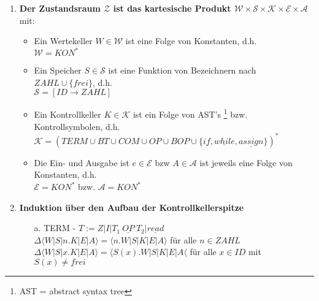 \begin{enumerate}
	\item \textbf{Der Zustandsraum $\mathcal{Z}$ ist das kartesische Produkt $\mathcal{W}\times\mathcal{S}\times\mathcal{K}\times\mathcal{E}\times\mathcal{A}$} mit:\\
		\begin{itemize}
			\item Ein Wertekeller $W\in\mathcal{W}$ ist eine Folge von Konstanten, d.h.\\ $\mathcal{W}=KON^*$
			\item Ein Speicher $S\in\mathcal{S}$ ist eine Funktion von Bezeichnern nach $ZAHL \cup \lbrace frei\rbrace$, d.h.\\ $\mathcal{S}=[ID\rightarrow ZAHL]$
			\item Ein Kontrollkeller $K\in\mathcal{K}$ ist ein Folge von AST's \footnote{AST = abstract syntax tree} bzw. Kontrollsymbolen, d.h.\\ $\mathcal{K}=\left(TERM \cup BT \cup COM \cup OP \cup BOP \cup \{\underline{if},\underline{while},\underline{assign}\}\right)^*$
			\item Die Ein- und Ausgabe ist $e\in\mathcal{E}$ bzw $A\in\mathcal{A}$ ist jeweils eine Folge von Konstanten, d.h.\\ $\mathcal{E} = KON^*$ bzw. $\mathcal{A} = KON^*$
		\end{itemize}
	\item \textbf{Induktion über den Aufbau der Kontrollkellerspitze}
		\begin{itemize}
			\item[a.] TERM - $T:= Z|I|T_1\ \underline{OP}\ T_2|\underline{read}$\\
	$\Delta\langle W|S|n.K|E|A\rangle=\langle n.W|S|K|E|A\rangle$ für alle $n\in ZAHL$\\
	$\Delta\langle W|S|x.K|E|A\rangle = \langle S(x).W|S|K|E|A\langle$ für alle $x\in ID$ mit $S(x)\neq frei$\\

\end{itemize}
\end{enumerate}
